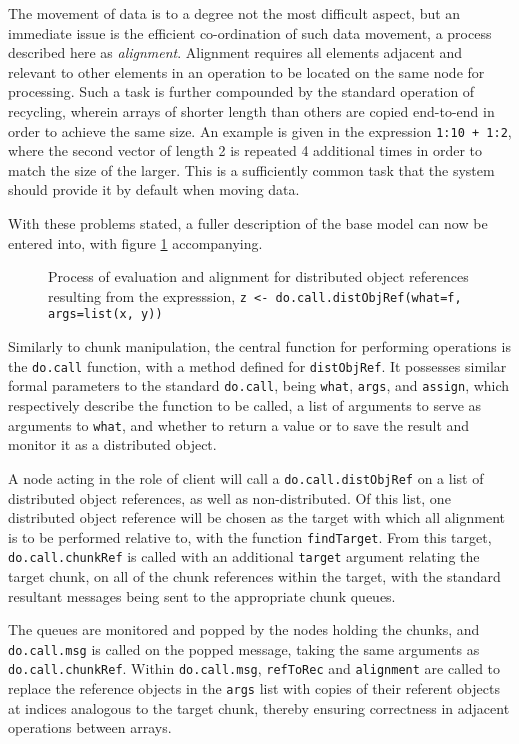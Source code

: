 The movement of data is to a degree not the most difficult aspect, but an
immediate issue is the efficient co-ordination of such data movement, a process
described here as \textit{alignment}.
Alignment requires all elements adjacent and relevant to other elements in an
operation to be located on the same node for processing.
Such a task is further compounded by the standard operation of recycling,
wherein arrays of shorter length than others are copied end-to-end in order to
achieve the same size.
An example is given in the expression \texttt{1:10 + 1:2}, where
the second vector of length 2 is repeated 4 additional times in order to match
the size of the larger.
This is a sufficiently common task that the system should provide it by default
when moving data.

With these problems stated, a fuller description of the base model can now be
entered into, with figure \cref{fig:distobj} accompanying.

\begin{figure}
	\centering
	
	\caption{\label{fig:distobj}Process of evaluation and alignment for
	distributed object references resulting from the expresssion,
	\texttt{z <- do.call.distObjRef(what=f, args=list(x, y))}}
\end{figure}

Similarly to chunk manipulation, the central function for performing operations
is the \texttt{do.call} function, with a method defined for
\texttt{distObjRef}. It possesses similar formal parameters to the standard
\texttt{do.call}, being \texttt{what}, \texttt{args}, and
\texttt{assign}, which respectively describe the function to be called, a list
of arguments to serve as arguments to \texttt{what}, and whether to return a
value or to save the result and monitor it as a distributed object.

A node acting in the role of client will call a
\texttt{do.call.distObjRef} on a list of distributed object
references, as well as non-distributed.
Of this list, one distributed object reference will be chosen as the target
with which all alignment is to be performed relative to, with the function
\texttt{findTarget}.
From this target, \texttt{do.call.chunkRef} is called with an
additional \texttt{target} argument relating the target chunk, on all of the
chunk references within the target, with the standard resultant messages being
sent to the appropriate chunk queues.

The queues are monitored and popped by the nodes holding the chunks, and
\texttt{do.call.msg} is called on the popped message, taking the
same arguments as \texttt{do.call.chunkRef}.
Within \texttt{do.call.msg}, \texttt{refToRec}
and \texttt{alignment} are called to replace the reference
objects in the \texttt{args} list with copies of their referent objects at
indices analogous to the target chunk, thereby ensuring correctness in
adjacent operations between arrays.

